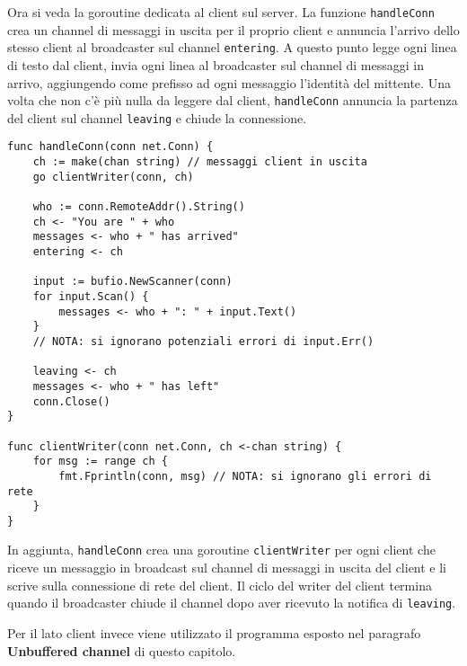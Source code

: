 \documentclass[../../thesis.tex]{subfiles}
\begin{document}
    Ora si veda la goroutine dedicata al client sul server.
    La funzione \verb"handleConn" crea un channel di messaggi in uscita per il proprio client e annuncia l'arrivo dello stesso client al broadcaster sul channel \verb"entering".
    A questo punto legge ogni linea di testo dal client, invia ogni linea al broadcaster sul channel di messaggi in arrivo, aggiungendo come prefisso ad ogni messaggio l'identità del mittente.
    Una volta che non c'è più nulla da leggere dal client, \verb"handleConn" annuncia la partenza del client sul channel \verb"leaving" e chiude la connessione.
    \begin{lstlisting}[frame = single, label = {lst:lstlisting7-10.3}]
func handleConn(conn net.Conn) {
    ch := make(chan string) // messaggi client in uscita
    go clientWriter(conn, ch)

    who := conn.RemoteAddr().String()
    ch <- "You are " + who
    messages <- who + " has arrived"
    entering <- ch

    input := bufio.NewScanner(conn)
    for input.Scan() {
        messages <- who + ": " + input.Text()
    }
    // NOTA: si ignorano potenziali errori di input.Err()

    leaving <- ch
    messages <- who + " has left"
    conn.Close()
}

func clientWriter(conn net.Conn, ch <-chan string) {
    for msg := range ch {
        fmt.Fprintln(conn, msg) // NOTA: si ignorano gli errori di rete
    }
}
    \end{lstlisting}
    In aggiunta, \verb"handleConn" crea una goroutine \verb"clientWriter" per ogni client che riceve un messaggio in broadcast sul channel di messaggi in uscita del client e li scrive sulla connessione di rete del client.
    Il ciclo del writer del client termina quando il broadcaster chiude il channel dopo aver ricevuto la notifica di \verb"leaving".
    \hfill \vspace{12pt}

    Per il lato client invece viene utilizzato il programma esposto nel paragrafo \textbf{Unbuffered channel} di questo capitolo.
    \clearpage
    \newpage
\end{document}
